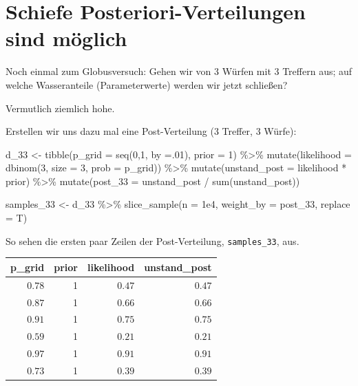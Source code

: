 \documentclass[
  a4paper,
  DIV=11]{scrreprt}
\newenvironment{Shaded}{\begin{snugshade}}{\end{snugshade}}
\newcommand{\AttributeTok}[1]{\textcolor[rgb]{0.40,0.45,0.13}{#1}}
\newcommand{\DecValTok}[1]{\textcolor[rgb]{0.68,0.00,0.00}{#1}}
\newcommand{\FloatTok}[1]{\textcolor[rgb]{0.68,0.00,0.00}{#1}}
\newcommand{\FunctionTok}[1]{\textcolor[rgb]{0.28,0.35,0.67}{#1}}
\newcommand{\NormalTok}[1]{\textcolor[rgb]{0.00,0.23,0.31}{#1}}
\newcommand{\OtherTok}[1]{\textcolor[rgb]{0.00,0.23,0.31}{#1}}
\newcommand{\SpecialCharTok}[1]{\textcolor[rgb]{0.37,0.37,0.37}{#1}}
\theoremstyle{definition}
\theoremstyle{remark}
\begin{document}
\hypertarget{schiefe-posteriori-verteilungen-sind-muxf6glich}{%
\section{Schiefe Posteriori-Verteilungen sind
möglich}\label{schiefe-posteriori-verteilungen-sind-muxf6glich}}

Noch einmal zum Globusversuch: Gehen wir von 3 Würfen mit 3 Treffern
aus; auf welche Wasseranteile (Parameterwerte) werden wir jetzt
schließen?

Vermutlich ziemlich hohe.

Erstellen wir uns dazu mal eine Post-Verteilung (3 Treffer, 3 Würfe):

\begin{Shaded}
\begin{Highlighting}[]
\NormalTok{d\_33 }\OtherTok{\textless{}{-}} 
  \FunctionTok{tibble}\NormalTok{(}\AttributeTok{p\_grid =} \FunctionTok{seq}\NormalTok{(}\DecValTok{0}\NormalTok{,}\DecValTok{1}\NormalTok{, }\AttributeTok{by =}\NormalTok{.}\DecValTok{01}\NormalTok{),}
         \AttributeTok{prior =} \DecValTok{1}\NormalTok{) }\SpecialCharTok{\%\textgreater{}\%} 
  \FunctionTok{mutate}\NormalTok{(}\AttributeTok{likelihood =} \FunctionTok{dbinom}\NormalTok{(}\DecValTok{3}\NormalTok{, }\AttributeTok{size =} \DecValTok{3}\NormalTok{, }\AttributeTok{prob =}\NormalTok{ p\_grid)) }\SpecialCharTok{\%\textgreater{}\%} 
  \FunctionTok{mutate}\NormalTok{(}\AttributeTok{unstand\_post =}\NormalTok{ likelihood }\SpecialCharTok{*}\NormalTok{ prior) }\SpecialCharTok{\%\textgreater{}\%} 
  \FunctionTok{mutate}\NormalTok{(}\AttributeTok{post\_33  =}\NormalTok{ unstand\_post }\SpecialCharTok{/} \FunctionTok{sum}\NormalTok{(unstand\_post)) }

\NormalTok{samples\_33 }\OtherTok{\textless{}{-}} 
\NormalTok{  d\_33 }\SpecialCharTok{\%\textgreater{}\%} 
    \FunctionTok{slice\_sample}\NormalTok{(}\AttributeTok{n =} \FloatTok{1e4}\NormalTok{, }
                 \AttributeTok{weight\_by =}\NormalTok{ post\_33, }
                 \AttributeTok{replace =}\NormalTok{ T)}
\end{Highlighting}
\end{Shaded}

So sehen die ersten paar Zeilen der Post-Verteilung,
\texttt{samples\_33}, aus.

\begin{longtable}{rrrr}
\toprule
p\_grid & prior & likelihood & unstand\_post \\ 
\midrule
$0.78$ & 1 & $0.47$ & $0.47$ \\ 
$0.87$ & 1 & $0.66$ & $0.66$ \\ 
$0.91$ & 1 & $0.75$ & $0.75$ \\ 
$0.59$ & 1 & $0.21$ & $0.21$ \\ 
$0.97$ & 1 & $0.91$ & $0.91$ \\ 
$0.73$ & 1 & $0.39$ & $0.39$ \\ 
\bottomrule
\end{longtable}
\end{document}
